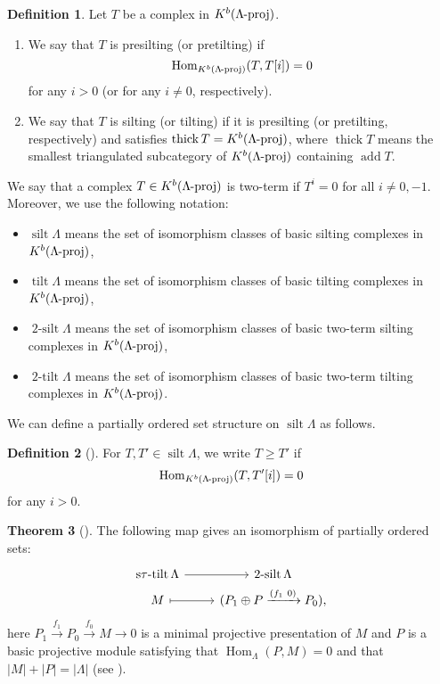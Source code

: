 \documentclass[pdftex,a4paper]{article}
\numberwithin{equation}{subsection}
\theoremstyle{definition}
\newtheorem{theorem}{Theorem}[section]
\newtheorem{definition}[theorem]{Definition}
\newcommand{\lproj}{\operatorname{\mathrm{\hspace{-2pt}-proj}}}
\newcommand{\thick}{\operatorname{\mathrm{thick}}}
\newcommand{\silt}{\operatorname{\mathrm{silt}}}
\newcommand{\tilt}{\operatorname{\mathrm{tilt}}}
\newcommand{\twosilt}{\operatorname{\mathrm{2-silt}}}
\newcommand{\twotilt}{\operatorname{\mathrm{2-tilt}}}
\newcommand{\Hom}{\operatorname{Hom}\nolimits}
\newcommand{\add}{\operatorname{\mathrm{add}}}
\newcommand{\stautilt}{\operatorname{\mathrm{s\tau-tilt}}}
\begin{document}
\begin{definition}
	Let \(T\) be a complex in \(K^b(\Lambda\lproj)\).
	\begin{enumerate}
		\item We say that \(T\) is presilting (or  pretilting) if \[\Hom_{K^b(\Lambda\lproj)}(T,T[i])=0\] for any \(i>0\) (or for any \(i \neq 0\), respectively).
		\item We say that \(T\) is  silting (or  tilting) if it is presilting (or pretilting, respectively) and satisfies \(\thick T =K^b(\Lambda\lproj)\), where \(\thick T\) means the smallest triangulated subcategory of \(K^b(\Lambda\lproj)\) containing \(\add T\).
	\end{enumerate}
\end{definition}

We say that a complex \(T \in K^b(\Lambda\lproj)\) is two-term if \(T^i = 0\) for all \(i \neq 0, -1\).
Moreover, we use the following notation:
\begin{itemize}
	\item \(\silt \Lambda\) means the set of isomorphism classes of basic silting complexes in \(K^b(\Lambda\lproj)\),
	\item \(\tilt \Lambda\) means the set of isomorphism classes of basic tilting complexes in \(K^b(\Lambda\lproj)\),
	\item \(\twosilt \Lambda\) means the set of isomorphism classes of basic two-term silting complexes in \(K^b(\Lambda\lproj)\),
	\item \(\twotilt \Lambda\) means the set of isomorphism classes of basic two-term tilting complexes in \(K^b(\Lambda\lproj)\).
\end{itemize}

We can define a partially ordered set structure on \(\silt \Lambda\) as follows.

\begin{definition}[{\cite[Definition 2.10, Theorem 2.11]{MR2927802}}]
	For \(T, T'\in \silt \Lambda\), we write \(T\geq T'\) if
	\begin{equation}
		\Hom_{K^b(\Lambda\lproj)}(T,T'[i])=0
	\end{equation}
	for any \(i>0\).
\end{definition}

\begin{theorem}[{\cite[Theorem 3.2 and Corollary 3.9]{MR3187626}}]\label{2020-03-27 17:22:17}
	The following map gives an isomorphism of partially ordered sets:
	\begin{equation}\label{2siltcorr}
		\begin{tikzcd}[row sep=1pt]
			\stautilt \Lambda \ar[r] & \twosilt \Lambda\\
			M\ar[r,mapsto]& (P_1\oplus P \xrightarrow{(f_1\ 0)} P_0),
		\end{tikzcd}
	\end{equation}
	here \(P_1\xrightarrow{f_1}P_0\xrightarrow{f_0}M\rightarrow 0\)
	is a minimal projective presentation of \(M\) and \(P\) is a basic projective module satisfying that \(\Hom_\Lambda(P,M)=0\) and that \(|M|+|P|=|\Lambda|\) (see \cite[Proposition 2.3 (b)]{MR3187626}).
\end{theorem}
\end{document}
